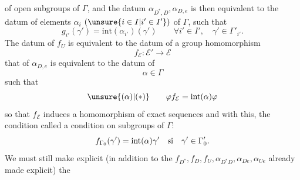 

of open subgroups of $\Gamma$,
and the datum 
$\alpha_{D^*,D},\alpha_{D,e}$ is then equivalent
to the datum of elements $\alpha_i$
$(\unsure{i\in I|i'\in I'})$ of $\Gamma$,
such that
\[
g_{i'}(\gamma')=\mathrm{int}(\alpha_{i'})(\gamma')
\qquad\forall i'\in I',\quad\gamma'\in\Gamma'_{i'}.
\]
The datum of $f_U$ is equivalent to the datum of a group homomorphism
\[
\boxed{f_{\mathcal E}:\mathcal E'\to\mathcal E}
\]
that of $\alpha_{D,e}$ is equivalent to the datum of
\[
\boxed{\alpha\in\Gamma}
\]
such that
\[
\unsure{(\alpha)|(*)}\qquad
\varphi f_{\mathcal E}=\mathrm{int}(\alpha)\varphi
\]
so that $f_{\mathcal E}$ induces a homomorphism of exact sequences
and with this, the condition called \unsure{$(\alpha)$|$(*)$}
 a condition on
 subgroups of $\Gamma$:
\[
f_{\Gamma_0}(\gamma')=\mathrm{int}(\alpha)\gamma'
\quad\hbox{si}\quad\gamma'\in\Gamma'_0.
\]
We must still make explicit (in addition to the
$f_{D^*},f_D,f_U,\alpha_{D^*D},\alpha_{De},\alpha_{Ue}$
already made explicit) the